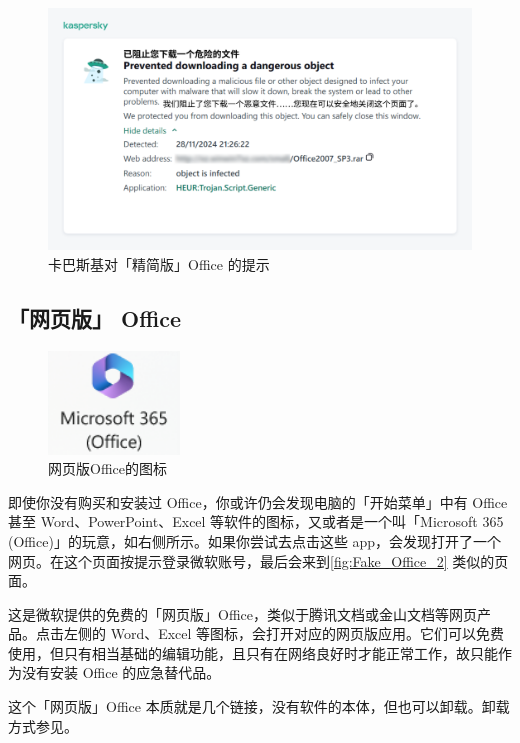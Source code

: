 \begin{figure}[htb!]
  \centering
  \includegraphics[width=.8\textwidth]{assets/software/Kaspersky_blocks_pirate_Office.pdf}
  \caption{卡巴斯基对「精简版」Office 的提示}
  \label{fig:Kaspersky_blocks_pirate_Office}
\end{figure}

\subsection{「网页版」 Office}

\begin{figure}
  \centering
  \vspace*{3ex}
  \includegraphics[width=3.5cm]{assets/software/Fake_Office.png}
  \caption{网页版Office的图标}
  \label{fig:Fake_Office}
\end{figure}

即使你没有购买和安装过 Office，你或许仍会发现电脑的「开始菜单」中有 Office 甚至 Word、PowerPoint、Excel 等软件的图标，又或者是一个叫「Microsoft 365 (Office)」的玩意，如右侧所示。如果你尝试去点击这些 app，会发现打开了一个网页。在这个页面按提示登录微软账号，最后会来到\autoref{fig:Fake_Office_2} 类似的页面。

这是微软提供的免费的「网页版」Office，类似于腾讯文档或金山文档等网页产品。点击左侧的 Word、Excel 等图标，会打开对应的网页版应用。它们可以免费使用，但只有相当基础的编辑功能，且只有在网络良好时才能正常工作，故只能作为没有安装 Office 的应急替代品。

这个「网页版」Office 本质就是几个链接，没有软件的本体，但也可以卸载。卸载方式参见。

